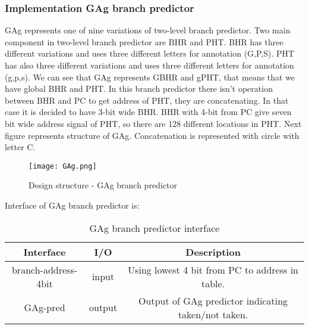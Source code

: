 \documentclass{scrreprt}
\begin{document}
\subsubsection*{Implementation GAg branch predictor}
GAg represents one of nine variations of two-level branch predictor. Two main component in two-level branch predictor are BHR and PHT. BHR has three different variations and uses three different letters for annotation (G,P,S). PHT has also three different variations and uses three different letters for annotation (g,p,s). We can see that GAg represents GBHR and gPHT, that means that we have global BHR and PHT. 
In this branch predictor there isn't operation between BHR and PC to get address of PHT, they are concatenating. In that case it is decided to have 3-bit wide BHR. BHR with 4-bit from PC give seven bit wide address signal of PHT, so there are 128 different locations in PHT. 
Next figure represents structure of GAg. Concatenation is represented with circle with letter C. 
\begin{figure}[htb!]
    \centering
    \texttt{[image: GAg.png]}
    \caption{Design structure - GAg branch predictor}
    \label{fig:GAg}
\end{figure}
\newline
\newline
\newline
\newline
\newline
\newline
Interface of GAg branch predictor is:
\begin{table}[htb!]
            \centering
            \begin{tabular}{|c|c|c|} \hline 
             Interface & I/O & Description \\ \hline  
             branch-address-4bit & input & Using lowest 4 bit from PC to address in table. \\ \hline  
             GAg-pred & output & Output of GAg predictor indicating taken/not taken.  \\ \hline
        \end{tabular}
        \caption{GAg branch predictor interface}
        \label{tab:GAgI}
    \end{table}

\end{document}
